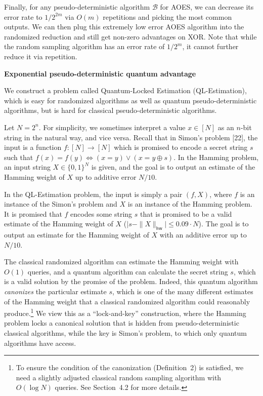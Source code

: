 Finally, for any pseudo-deterministic algorithm $\mathcal{B}$ for AOES, we can decrease its error rate to $1/2^{2m}$ via $O(m)$ repetitions and picking the most common outputs. We can then plug this extremely low error AOES algorithm into the randomized reduction and still get non-zero advantages on XOR. Note that while the random sampling algorithm has an error rate of $1/2^{m}$, it cannot further reduce it via repetition.\par





\par\medskip\noindent\textbf{Exponential pseudo-deterministic quantum advantage}\par




We construct a problem called Quantum-Locked Estimation (QL-Estimation), which is easy for randomized algorithms as well as quantum pseudo-deterministic algorithms, but is hard for classical pseudo-deterministic algorithms.\par




Let $N=2^{n}$. For simplicity, we sometimes interpret a value $x\in[N]$ as an $n$-bit string in the natural way, and vice versa.
Recall that in Simon’s problem [22],
the input is a function $f:[N]\rightarrow[N]$ which is promised to encode a secret string $s$ such that $f(x)=f(y)\iff(x=y)\vee(x=y\oplus s)$. In the Hamming problem, an input string $X\in\{0,1\}^{N}$ is given, and the goal is to output an estimate of the Hamming weight of $X$ up to additive error $N/10$.\par




In the QL-Estimation problem, the input is simply a pair $(f,X)$, where $f$ is an instance of the Simon’s problem and $X$ is an instance of the Hamming problem.
It is promised that $f$ encodes some string $s$ that is promised to be a valid estimate of the Hamming weight of $X$ ($\big|s-\|X\|_{\mathsf{hw}}\big|\leq 0.09\cdot N$).
The goal is to output an estimate for the Hamming weight of $X$ with an additive error up to $N/10$.\par




The classical randomized algorithm can estimate the Hamming weight with $O(1)$ queries, and a quantum algorithm can calculate the secret string $s$, which is a valid solution by the promise of the problem. Indeed, this quantum algorithm \emph{canonizes} the particular estimate $s$, which is one of the many different estimates of the Hamming weight that a classical randomized algorithm could reasonably produce.\footnote{To ensure the condition of the canonization (Definition 2) is satisfied, we need a slightly adjusted classical random sampling algorithm with $O(\log N)$ queries. See Section 4.2 for more details.}
We view this as a “lock-and-key” construction, where
the Hamming problem locks a canonical solution that is hidden from pseudo-deterministic classical algorithms, while the key is Simon’s problem, to which only quantum algorithms have access.\par




